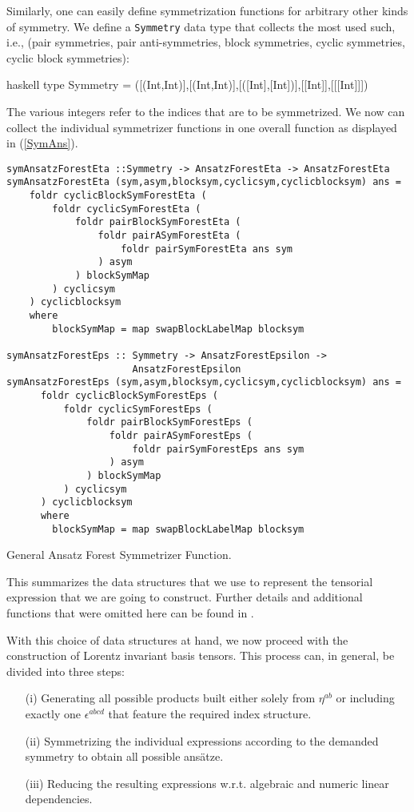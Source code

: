 Similarly, one can easily define symmetrization functions for arbitrary other kinds of symmetry. We define a \texttt{Symmetry} data type that collects the most used such, i.e., (pair symmetries, pair anti-symmetries, block symmetries, cyclic symmetries, cyclic block symmetries):
\begin{center}
\begin{cminted}{haskell}
type Symmetry = ([(Int,Int)],[(Int,Int)],[([Int],[Int])],[[Int]],[[[Int]]])
\end{cminted}
\end{center}
The various integers refer to the indices that are to be symmetrized. We now can collect the individual symmetrizer functions in one overall function as displayed in (\ref{SymAns}).
\begin{listing}[hbt!] 
\begin{verbatim}
symAnsatzForestEta ::Symmetry -> AnsatzForestEta -> AnsatzForestEta
symAnsatzForestEta (sym,asym,blocksym,cyclicsym,cyclicblocksym) ans =
    foldr cyclicBlockSymForestEta (
        foldr cyclicSymForestEta (
            foldr pairBlockSymForestEta (
                foldr pairASymForestEta (
                    foldr pairSymForestEta ans sym
                ) asym
            ) blockSymMap
        ) cyclicsym
    ) cyclicblocksym
    where
        blockSymMap = map swapBlockLabelMap blocksym

symAnsatzForestEps :: Symmetry -> AnsatzForestEpsilon ->
                      AnsatzForestEpsilon
symAnsatzForestEps (sym,asym,blocksym,cyclicsym,cyclicblocksym) ans =
      foldr cyclicBlockSymForestEps (
          foldr cyclicSymForestEps (
              foldr pairBlockSymForestEps (
                  foldr pairASymForestEps (
                      foldr pairSymForestEps ans sym
                  ) asym
              ) blockSymMap
          ) cyclicsym
      ) cyclicblocksym
      where
        blockSymMap = map swapBlockLabelMap blocksym
\end{verbatim} 
\caption{General Ansatz Forest Symmetrizer Function.}\label{SymAns}
\end{listing}

This summarizes the data structures that we use to represent the tensorial expression that we are going to construct. Further details and additional functions that were omitted here can be found in \cite{sparse-tensor}.  

With this choice of data structures at hand, we now proceed with the construction of Lorentz invariant basis tensors.  
This process can, in general, be divided into three steps:
\begin{itemize}
    \item[(i)] Generating all possible products built either solely from $\eta^{ab}$ or including exactly one $\epsilon^{abcd}$ that feature the required index structure.
    \item[(ii)] Symmetrizing the individual expressions according to the demanded symmetry to obtain all possible ansätze.
    \item[(iii)] Reducing the resulting expressions w.r.t. algebraic and numeric linear dependencies.
\end{itemize}

